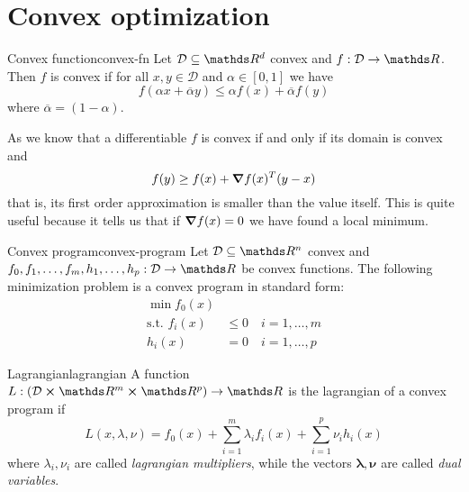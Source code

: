 \documentclass[12pt]{extarticle}
\renewcommand{\vec}[1]{\bm{#1}}
\begin{document}
\section{Convex optimization}

\begin{definition}{Convex function}{convex-fn}
	Let $\mathcal D \subseteq \R^d$ convex and $f: \mathcal D \to \R$.
	Then $f$ is convex if for all $x, y \in \mathcal D$ and $\alpha \in [0, 1]$ we have
	\begin{equation}
		f(\alpha x + \overline{\alpha} y) \leq \alpha f(x) + \overline \alpha f(y)
	\end{equation}
	where $\overline \alpha = (1-\alpha)$.
\end{definition}

As we know that a differentiable $f$ is convex if and only if its domain is convex and
\begin{equation}
	f(y) \geq f(x) + \grad f(x)^T(y-x)
\end{equation}
that is, its first order approximation is smaller than the value itself.
This is quite useful because it tells us that if $\grad f(x) = 0$ we have found a local minimum.


\begin{definition}{Convex program}{convex-program}
	Let $\mathcal D \subseteq \R^n$ convex and $f_0, f_1, \dots, f_m, h_1, \dots, h_p: \mathcal D \to \R$
	be convex functions.
	The following minimization problem is a convex program in standard form:
	\begin{align}
		\min f_0(x)         &                              \\
		\text{s.t. }	f_i(x) & \leq 0 \quad i = 1, \dots, m \\
		h_i(x)              & = 0    \quad i = 1, \dots, p
	\end{align}
\end{definition}

\begin{definition}{Lagrangian}{lagrangian}
	A function $L: (\mathcal D \cross \R^m \cross \R^p) \to \R$ is the lagrangian of a convex
	program if
	\begin{equation}
		L(x, \lambda, \nu) = f_0(x) + \sum_{i = 1}^m \lambda_i f_i(x) + \sum_{i = 1}^p \nu_i h_i(x)
	\end{equation}
	where $\lambda_i, \nu_i$ are called \emph{lagrangian multipliers}, while
	the vectors $\vec \lambda, \vec \nu$ are called \emph{dual variables}.
\end{definition}
\end{document}
